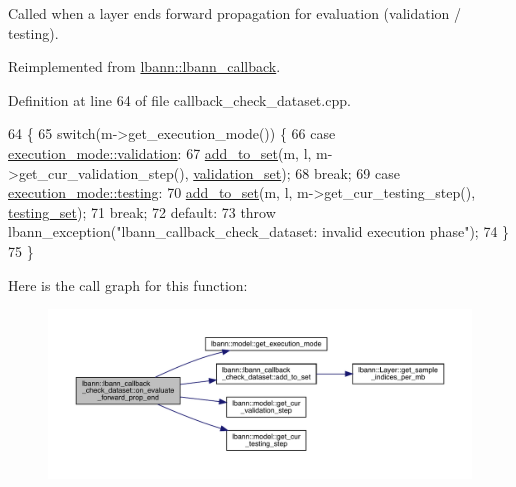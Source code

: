 Called when a layer ends forward propagation for evaluation (validation / testing). 

Reimplemented from \hyperlink{classlbann_1_1lbann__callback_ae23c5a61b81dbdfbd79736ac2b6035aa}{lbann\+::lbann\+\_\+callback}.



Definition at line 64 of file callback\+\_\+check\+\_\+dataset.\+cpp.


\begin{DoxyCode}
64                                                                                   \{
65   \textcolor{keywordflow}{switch}(m->get\_execution\_mode()) \{
66   \textcolor{keywordflow}{case} \hyperlink{base_8hpp_a2781a159088df64ed7d47cc91c4dc0a8aa617908b172c473cb8e8cda059e55bf0}{execution\_mode::validation}:
67     \hyperlink{classlbann_1_1lbann__callback__check__dataset_a17aff74d9926e07bfa1f090ad39bb4b6}{add\_to\_set}(m, l, m->get\_cur\_validation\_step(), \hyperlink{classlbann_1_1lbann__callback__check__dataset_aab6d04a40d20d1b0bf70f9bfdd85f84c}{validation\_set});
68     \textcolor{keywordflow}{break};
69   \textcolor{keywordflow}{case} \hyperlink{base_8hpp_a2781a159088df64ed7d47cc91c4dc0a8aae2b1fca515949e5d54fb22b8ed95575}{execution\_mode::testing}:
70     \hyperlink{classlbann_1_1lbann__callback__check__dataset_a17aff74d9926e07bfa1f090ad39bb4b6}{add\_to\_set}(m, l, m->get\_cur\_testing\_step(), \hyperlink{classlbann_1_1lbann__callback__check__dataset_a15445849bae3621a3a4364b3ebbbc7f3}{testing\_set});
71     \textcolor{keywordflow}{break};
72   \textcolor{keywordflow}{default}:
73     \textcolor{keywordflow}{throw} lbann\_exception(\textcolor{stringliteral}{"lbann\_callback\_check\_dataset: invalid execution phase"});
74   \}
75 \}
\end{DoxyCode}
Here is the call graph for this function\+:\nopagebreak
\begin{figure}[H]
\begin{center}
\leavevmode
\includegraphics[width=350pt]{classlbann_1_1lbann__callback__check__dataset_a1223f07081d495d971cdf205f892c50d_cgraph}
\end{center}
\end{figure}
